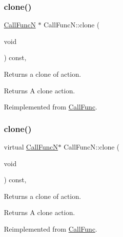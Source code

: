 \subsubsection{\texorpdfstring{clone()}{clone()}\hspace{0.1cm}{\footnotesize\ttfamily [1/2]}}
{\footnotesize\ttfamily \hyperlink{classCallFuncN}{Call\+FuncN} $\ast$ Call\+Func\+N\+::clone (\begin{DoxyParamCaption}\item[{void}]{ }\end{DoxyParamCaption}) const\hspace{0.3cm}{\ttfamily [override]}, {\ttfamily [virtual]}}

Returns a clone of action.

\begin{DoxyReturn}{Returns}
A clone action. 
\end{DoxyReturn}


Reimplemented from \hyperlink{classCallFunc_a87c2d0fecf4d8ae9d4b58a28e594daf0}{Call\+Func}.

\mbox{\label{classCallFuncN_aad41687c463cb5d6e9a5879b0dd8b1e3}} 
\subsubsection{\texorpdfstring{clone()}{clone()}\hspace{0.1cm}{\footnotesize\ttfamily [2/2]}}
{\footnotesize\ttfamily virtual \hyperlink{classCallFuncN}{Call\+FuncN}$\ast$ Call\+Func\+N\+::clone (\begin{DoxyParamCaption}\item[{void}]{ }\end{DoxyParamCaption}) const\hspace{0.3cm}{\ttfamily [override]}, {\ttfamily [virtual]}}

Returns a clone of action.

\begin{DoxyReturn}{Returns}
A clone action. 
\end{DoxyReturn}


Reimplemented from \hyperlink{classCallFunc_a87c2d0fecf4d8ae9d4b58a28e594daf0}{Call\+Func}.

\mbox{\label{classCallFuncN_a50867d17b83343d084eff6fd5b5670d9}} 
